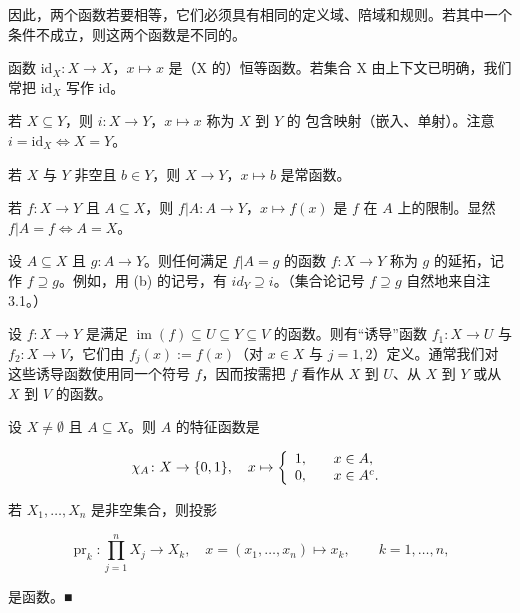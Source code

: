 因此，两个函数若要相等，它们必须具有相同的定义域、陪域和规则。若其中一个条件不成立，则这两个函数是不同的。

\begin{example}

\begin{items}
\item

函数 $ \mathrm{id}_{X}: X \to X $，$ x \mapsto x $ 是（X 的）恒等函数。若集合 X 由上下文已明确，我们常把 $ \mathrm{id}_{X} $ 写作 id。

\item

若 $X \subseteq Y$，则 $i: X \to Y$，$x \mapsto x$ 称为 $X$ $\mathbf{到}$ $Y$ 的 $\mathbf{包含映射}$（嵌入、单射）。注意 $i = \mathrm{id}_X \iff X = Y$。

\item

若 $X$ 与 $Y$ 非空且 $b \in Y$，则 $X \to Y$，$x \mapsto b$ 是常函数。

\item

若 $ f: X \to Y $ 且 $ A \subseteq X $，则 $ f|A: A \to Y $，$ x \mapsto f(x) $ 是 $ f $ 在 $ A $ 上的限制。显然 $ f|A = f \Leftrightarrow A = X $。

\item

设 $ A \subseteq X $ 且 $ g: A \to Y $。则任何满足 $ f|A = g $ 的函数 $ f: X \to Y $ 称为 $ g $ 的延拓，记作 $ f \supseteq g $。例如，用 (b) 的记号，有 $ id_Y \supseteq i $。（集合论记号 $ f \supseteq g $ 自然地来自注 3.1。）

\item

设 $f: X \to Y$ 是满足 $\operatorname{im}(f) \subseteq U \subseteq Y \subseteq V$ 的函数。则有“诱导”函数 $f_1: X \to U$ 与 $f_2: X \to V$，它们由 $f_j(x) := f(x)$（对 $x \in X$ 与 $j = 1,2$）定义。通常我们对这些诱导函数使用同一个符号 $f$，因而按需把 $f$ 看作从 $X$ 到 $U$、从 $X$ 到 $Y$ 或从 $X$ 到 $V$ 的函数。

\item

设 $ X \neq \emptyset $ 且 $ A \subseteq X $。则 $ A $ 的特征函数是

\begin{equation*}
\chi_{A}\colon X\to\{0,1\},\quad x\mapsto\left\{\begin{array}{l l}{1,}&{\quad x\in A,}\\ {0,}&{\quad x\in A^{c}.}\\ \end{array}\right.
\end{equation*}
\item

若 $ X_{1}, \ldots, X_{n} $ 是非空集合，则投影

\[
\operatorname{pr}_{k}:\prod_{j=1}^{n}X_{j}\rightarrow X_{k},\quad x=(x_{1},\ldots,x_{n})\mapsto x_{k},\qquad k=1,\ldots,n,
\]

是函数。■

\end{items}

\end{example}

